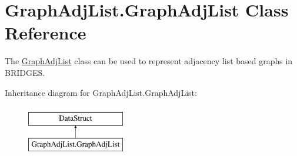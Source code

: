 \hypertarget{class_graph_adj_list_1_1_graph_adj_list}{}\section{Graph\+Adj\+List.\+Graph\+Adj\+List Class Reference}
\label{class_graph_adj_list_1_1_graph_adj_list}


The \hyperlink{class_graph_adj_list_1_1_graph_adj_list}{Graph\+Adj\+List} class can be used to represent adjacency list based graphs in B\+R\+I\+D\+G\+ES.  


Inheritance diagram for Graph\+Adj\+List.\+Graph\+Adj\+List\+:\begin{figure}[H]
\begin{center}
\leavevmode
\includegraphics[height=2.000000cm]{class_graph_adj_list_1_1_graph_adj_list}
\end{center}
\end{figure}
